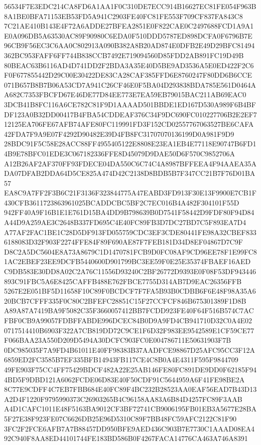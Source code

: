 \documentclass[UTF8,fontset=fandol,zihao=-4,a4paper]{ctexart}
\begin{document}
{{56534F7E3EDC214CA8FD6A1AA1F0C310DE7ECC914B16627EC81FE054F963B8A1BE0BFA71153EB53FD5A941C2903FE40FC81FE553F709CF837FA843C8
7C21AE410B143E4F72A6ADDE27BFEA2851E0F822CAE0C2497688FCD1A9A1E0A096DB5A63530AC89F90980C6EDA0F510DDD5787ED898DCFA0F6796B7E
96CB9F56EC3C6AA0C802913A090B382A8B20AD874E0DFB2E49D29BFC81494362BC953FAFF6FF744B838CCB7492E719094560D85FDD2AB891FC19D49B
80BEAC63B6116AD4D741DD2F2BDA3A35E40D5BE9AD3536A5E0ED422F2C6F0F677855442D29C00E30422DE83CA28CAF385FFD6E8760247F80DD6B6CCE
071B657B8B7B06A53CD7A941C26CF46E0F5BA04D293838BDA785E561D0464AA682C7353FBCFD67E46DE77D84EE773E7EA59EB79015BAC211AB69EAC0
3DCB41B8FC116A6CE782C81F9D1AAAAD501BBDE1ED167D530A989F6B4BFDF123A0B32DD00417B4FBA54CDDEAF376C34F9DC690FC010227706B2E2EF7
12125EA706FE67AFB74AFE80FC119991FD3F152CD02557767063527BE6CAFA42FDA7F9A9E07F4292D90482E39D4FB8FC31707070136199D0A981F9D9
28BDC91F5C58E28ACC88FF4955405122E8808E23EA1EB4E77118E90747B6FD14B9E78BFC01EDE3C067182336FFE8D45079D9DAE50D6F570C9852706A
A12B26AF2AF370FF93FDECE04DA550C6C74C4A8987BFFEEA4F94AAEA35ADA07DFAB2DDA64D5CE825A474D42C2138D8BDB5B7F347CC21B7F76D01BA57
EA8C9A7FF2F3B6C21F3136F323844775A47EABD3FD913F30E13F9900E7CB1F430CFB3611723863961025BCADDCBC5BF2C7EC016B4A482F304101F55D
942FF40A9F16B1E1E761D15BA4DD9B798639B0D7541F58442D9FDF80F94D84A44D9A259AE3C2648B337FD695C4E40FC89FB3D7DC27BD7C5F893EA7D4
A77AF2FAC1BE1C28D5DF913FD055759CDC3EF3CDE80441FE98A32CBEF8336188083D32F903F2274FFE84F89F690AE87F7FEB181D34D8EF04867D7C9F
D8C2A5DC5604E8A73A8679C1D1470781FCB9D0FC08AF9CD96EE78F1E99FC81AC2EBEF23EE9DCFB5440600D901799BC3EE59F0E25E35374FBAEF16AED
C9DB583E30DD8A02C2A76C11556D93240C2BF26772D9393E0F08F53DF943446893C91FBC5A6E8425CAFFB488E762FBCE7755D314AB7D9EAC26356FFB
5267E2E051BF5D11658F10C89F0BCDCF7F7FA5B93B0CDBB6F6E48F98A35A620BCB7CFFF335F0C80C2BFEFC28851C15F27CCFCF846B675301389F1D8B
A89A87A7419BA9F5082C35F3660057412BB7FCDD923FE40F64F516B574C7ACFBF0CB9A99057FDBFFABDE996DCEC84B0D9A9FD4CB941710D32C0A4E02
0717514410B6903F322A7CB819DD72C9CE1F6D32F983EE9542589E1CF59CE77F066BAA23A550D209D5494A30DCFC903FC0E004786711E50631903F7B
0DC985035F7A9FD4B61011E40FF98383B37AADFCE98867D25AFC95CC3F12A6859ED2FC3585B7EF335BFB14943FB117CE4C8B0A4E4311F595F9844709
49FE903F75CC4FF75429BDCF482A22E25AB146FE80FC891DE9DD0F62185F944BD5F9DBD121A6062FCDE06D83E40F50CDF91C5644959A6F41FE98BE2A
8C77E9CDFF4C7EB7FBB684E40FC89F4BC232B28523AA0EAF56EAD7B43D13A2D4F1220F9795990373C26903265B4C96158AA83A6B84D4257FC89F3AAB
A4D1CAFC1011E48F5163BA9012CF3BF72741CB9006195FB01EB3A5677E28BA5F27E38F923FE07C6626DB25E96D5310C89F7BB48FC59AFC2122C81F90
3FC2F2FCE6AFB7A7B88457DD950BFE9AED436C903B7E7730C1AAAD08EA492C940F8AA8ED44101744FE183BD586B0F4267FACA14776CA463A746A8391
}}
\end{document}
